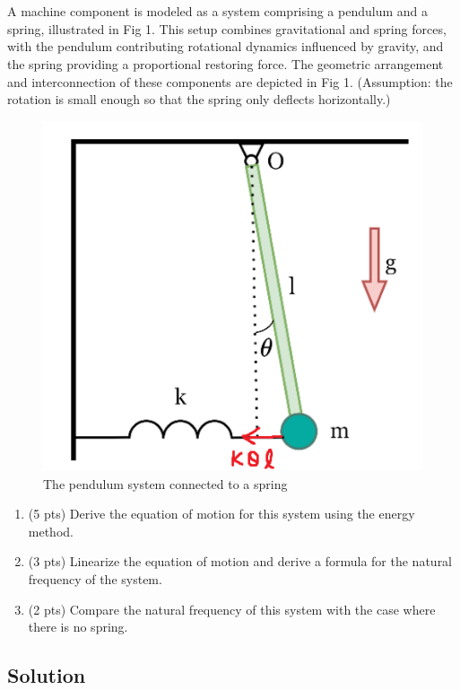 \section{}
A machine component is modeled as a system comprising a pendulum and a spring, illustrated in 
Fig 1. This setup combines gravitational and spring forces, with the pendulum contributing 
rotational dynamics influenced by gravity, and the spring providing a proportional restoring force. 
The geometric arrangement and interconnection of these components are depicted in Fig 1. 
(Assumption: the rotation is small enough so that the spring only deflects horizontally.)

\begin{figure}[h]
    \centering
    \includegraphics[width=0.5\linewidth]{Questions/Figures/q3 problem diagram.png}
    \caption{The pendulum system connected to a spring}
    \label{fig:q3-png}
\end{figure}

\begin{enumerate}[label=(\alph*)]
    \item (5 pts) Derive the equation of motion for this system using the energy method.
    \item (3 pts) Linearize the equation of motion and derive a formula for the natural frequency of the 
        system.
    \item (2 pts) Compare the natural frequency of this system with the case where there is no spring.
\end{enumerate}

\subsection*{Solution}
